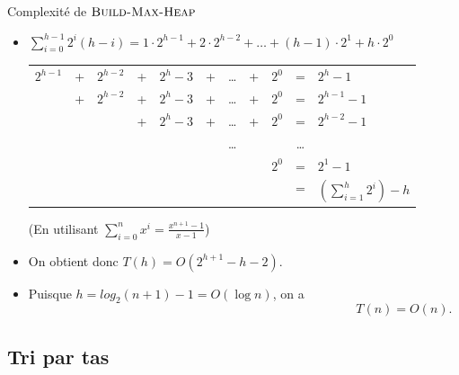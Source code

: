 \begin{frame}{Complexité de $\textnormal{\scshape Build-Max-Heap}$}
\begin{itemize}
\item $\sum_{i=0}^{h-1} 2^i (h-i)=1\cdot 2^{h-1}+2\cdot 2^{h-2}+\ldots+(h-1)\cdot 2^1+h\cdot 2^0$

\bigskip

\begin{small}
\begin{tabular}{ccccccccccl}
$2^{h-1}$ & + & $2^{h-2}$ & + & $2^h-3$ & + & \ldots & +& $2^0$ & = & $2^{h}-1$\\
 & + & $2^{h-2}$ & + & $2^h-3$ & + & \ldots & +& $2^0$ & = & $2^{h-1}-1$\\
 & & & + & $2^h-3$ & + & \ldots & +& $2^0$ & = & $2^{h-2}-1$\\
 &   &        &   &      &   & \ldots &  &    & \ldots & \\
 &   &        &   &     &    &        & & $2^0$ & = & $2^1-1$\\
\hline
 &   &        &   &     &    &        & &     & = & $\left(\sum_{i=1}^h 2^i\right)-h$
\end{tabular}
\end{small}

\medskip

(En utilisant $\sum_{i=0}^n x^i=\frac{x^{n+1}-1}{x-1}$)

\bigskip

\item On obtient donc $T(h)=O(2^{h+1}-h-2).$
\item Puisque $h=log_2(n+1)-1=O(\log n)$, on a $$T(n)=O(n).$$
\end{itemize}
\end{frame}


\subsection{Tri par tas}

